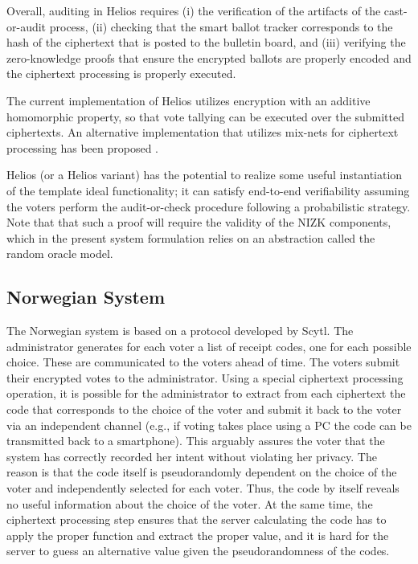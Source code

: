 Overall, auditing in Helios requires (i) the verification of the
artifacts of the cast-or-audit process, (ii) checking that the smart
ballot tracker corresponds to the hash of the ciphertext that is
posted to the bulletin board, and (iii) verifying the zero-knowledge
proofs that ensure the encrypted ballots are properly encoded and the
ciphertext processing is properly executed.

The current implementation of Helios utilizes encryption with an
additive homomorphic property, so that vote tallying can be executed
over the submitted ciphertexts. An alternative implementation that
utilizes mix-nets for ciphertext processing has been proposed
\cite{tsoukalas2013}.

Helios (or a Helios variant) has the potential to realize some useful
instantiation of the template ideal functionality; it can satisfy
end-to-end verifiability assuming the voters perform the
audit-or-check procedure following a probabilistic strategy. Note that
that such a proof will require the validity of the NIZK components,
which in the present system formulation relies on an abstraction
called the random oracle model.

\subsection{Norwegian System}

The Norwegian system \cite{gjosteen2012} is based on a protocol
developed by Scytl. The administrator generates for each voter a list
of receipt codes, one for each possible choice. These are communicated
to the voters ahead of time. The voters submit their encrypted votes
to the administrator. Using a special ciphertext processing operation,
it is possible for the administrator to extract from each ciphertext
the code that corresponds to the choice of the voter and submit it
back to the voter via an independent channel (e.g., if voting takes
place using a PC the code can be transmitted back to a smartphone).
This arguably assures the voter that the system has correctly recorded
her intent without violating her privacy. The reason is that the code
itself is pseudorandomly dependent on the choice of the voter and
independently selected for each voter. Thus, the code by itself
reveals no useful information about the choice of the voter. At the
same time, the ciphertext processing step ensures that the server
calculating the code has to apply the proper function and extract the
proper value, and it is hard for the server to guess an alternative
value given the pseudorandomness of the codes.

